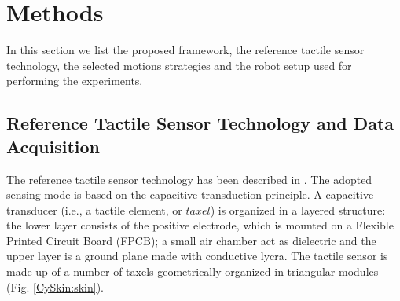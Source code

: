 \documentclass[]{interact}
\theoremstyle{plain}%
\theoremstyle{definition}
\theoremstyle{remark}
\begin{document}

\section{Methods}

In this section we list the proposed framework, the reference tactile sensor technology, the selected motions strategies and the robot setup used for performing the experiments.

\subsection{Reference Tactile Sensor Technology and Data Acquisition} \label{sec_setup}


The reference tactile sensor technology has been described in \cite{schmitz_methods_2011}. The adopted sensing mode is based on the capacitive transduction principle. A capacitive transducer (i.e., a tactile element, or $taxel$) is organized in a layered structure: the lower layer consists of the positive electrode, which is mounted on a Flexible Printed Circuit Board (FPCB); a small air chamber act as dielectric and the upper layer is a ground plane made with conductive lycra. The tactile sensor is made up of a number of taxels geometrically organized in triangular modules (Fig. \ref{CySkin:skin}). 
\end{document}
